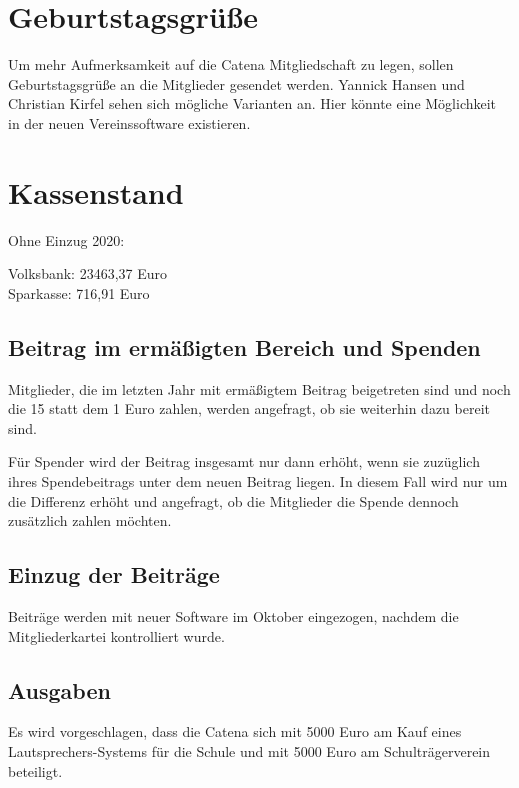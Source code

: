\documentclass[a4paper, 11pt]{article}
\begin{document}
\section*{Geburtstagsgrüße}

Um mehr Aufmerksamkeit auf die Catena Mitgliedschaft zu legen, sollen Geburtstagsgrüße an die Mitglieder gesendet werden.
Yannick Hansen und Christian Kirfel sehen sich mögliche Varianten an.
Hier könnte eine Möglichkeit in der neuen Vereinssoftware existieren.

\section*{Kassenstand}

Ohne Einzug 2020:

Volksbank: 23463,37 Euro\\
Sparkasse: 716,91 Euro


\subsection*{Beitrag im ermäßigten Bereich und Spenden}

Mitglieder, die im letzten Jahr mit ermäßigtem Beitrag beigetreten sind und noch die 15 statt dem 1 Euro zahlen,
werden angefragt, ob sie weiterhin dazu bereit sind.

Für Spender wird der Beitrag insgesamt nur dann erhöht, wenn sie zuzüglich ihres Spendebeitrags unter dem neuen Beitrag liegen.
In diesem Fall wird nur um die Differenz erhöht und angefragt, ob die Mitglieder die Spende dennoch zusätzlich zahlen möchten.

\subsection*{Einzug der Beiträge}

Beiträge werden mit neuer Software im Oktober eingezogen, nachdem die Mitgliederkartei kontrolliert wurde.

\subsection*{Ausgaben}

Es wird vorgeschlagen, dass die Catena sich mit 5000 Euro am Kauf eines Lautsprechers-Systems für die Schule und mit 5000 Euro am Schulträgerverein beteiligt.
\end{document}
